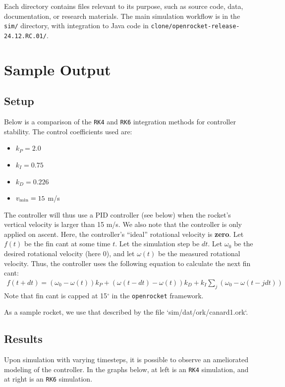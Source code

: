 \documentclass{amsdtx}
\begin{document}
Each directory contains files relevant to its purpose, such as source
code, data, documentation, or research materials. The main simulation
workflow is in the \texttt{sim/} directory, with integration to Java
code in \texttt{clone/openrocket-release-24.12.RC.01/}.
\newpage
\section{Sample Output}
\subsection{Setup}
Below is a comparison of the \verb|RK4| and \verb|RK6| integration methods for controller stability. The control coefficients used are:
\begin{multicols}{3}
\begin{itemize}
  \item $k_P=2.0$
  \item $k_I=0.75$
  \item $k_D=0.226$
  \item $v_{\rm min}=15$ m/s
\end{itemize}
\end{multicols}
The controller will thus use a PID controller (see below) when the rocket's vertical velocity is larger than 15 m/s. We also note that the controller is only applied on ascent. Here, the controller's ``ideal'' rotational velocity is \textbf{zero}. Let $f(t)$ be the fin cant at some time $t$. Let the simulation step be $dt$. Let $\omega_0$ be the desired rotational velocity (here $0$), and let $\omega(t)$ be the measured rotational velocity. Thus, the controller uses the following equation to calculate the next fin cant:
\begin{align}
  f(t+dt) = (\omega_0-\omega(t))k_P + (\omega(t-dt)-\omega(t))k_D + k_I\sum_j(\omega_0-\omega(t-jdt))
\end{align}
Note that fin cant is capped at 15$^\circ$ in the \verb|openrocket| framework.

As a sample rocket, we use that described by the file `sim/dat/ork/canard1.ork`.
\subsection{Results}
Upon simulation with varying timesteps, it is possible to observe an ameliorated modeling of the controller. In the graphs below, at left is an \verb|RK4| simulation, and at right is an \verb|RK6| simulation.
\end{document}
